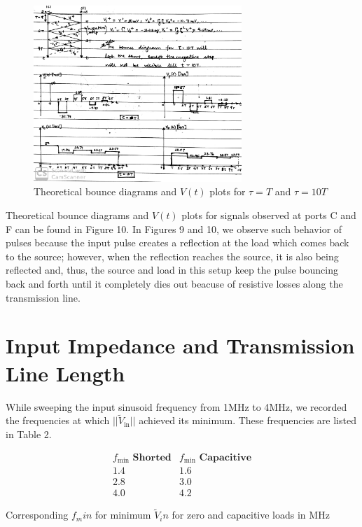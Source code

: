 \documentclass[10pt]{article}
\begin{document}
\begin{figure}[ht]
    \centering
    \includegraphics[width=0.7\textwidth]{../photos/lab1/v_t_bounce_mult_ref.jpg}
    \caption{Theoretical bounce diagrams and $V(t)$ plots for $\tau = T$ and $\tau = 10T$\vspace{-0.5cm}}
    \label{v_t_bounce_mult}
\end{figure}

Theoretical bounce diagrams and $V(t)$ plots for signals observed at ports C and F can be found in Figure 10. In Figures 9 and 10, 
we observe such behavior of pulses because the input pulse creates a reflection at the load which comes back to the source; however,
when the reflection reaches the source, it is also being reflected and, thus, the source and load in this setup 
keep the pulse bouncing back and forth until it completely dies out beacuse of resistive losses along the transmission line.


\section{Input Impedance and Transmission Line Length}

While sweeping the input sinusoid frequency from 1MHz to 4MHz, we recorded the frequencies at 
which $||\tilde V_\text{in}||$ achieved its minimum. These frequencies are listed in Table 2.
\begin{table}[ht]
    \[
        \begin{array}{c|c}
            f_\text{min} \textbf{ Shorted} &  f_\text{min} \textbf{ Capacitive} \\ \hline
            1.4 & 1.6\\
            2.8 & 3.0\\
            4.0 & 4.2
        \end{array}
    \]
    \caption{Corresponding $f_min$ for minimum $\tilde V_in$ for zero and capacitive loads in $\text{MHz}$\vspace{-0.5cm}}
\end{table}
\end{document}

